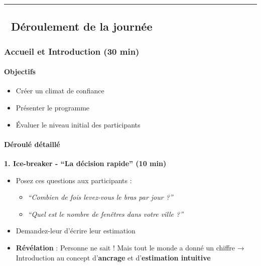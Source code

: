 \documentclass[
]{article}
\providecommand{\tightlist}{%
  \setlength{\itemsep}{0pt}\setlength{\parskip}{0pt}}
\begin{document}
\begin{center}\rule{0.5\linewidth}{0.5pt}\end{center}

\subsection{📅 Déroulement de la
journée}\label{duxe9roulement-de-la-journuxe9e}

\subsubsection{\texorpdfstring{\textbf{Accueil et Introduction (30
min)}}{Accueil et Introduction (30 min)}}\label{accueil-et-introduction-30-min}

\paragraph{Objectifs}\label{objectifs}

\begin{itemize}
\tightlist
\item
  Créer un climat de confiance
\item
  Présenter le programme
\item
  Évaluer le niveau initial des participants
\end{itemize}

\paragraph{Déroulé détaillé}\label{duxe9rouluxe9-duxe9tailluxe9}

\textbf{1. Ice-breaker - ``La décision rapide'' (10 min)}

\begin{itemize}
\tightlist
\item
  Posez ces questions aux participants :

  \begin{itemize}
  \tightlist
  \item
    \emph{``Combien de fois levez-vous le bras par jour ?''}
  \item
    \emph{``Quel est le nombre de fenêtres dans votre ville ?''}
  \end{itemize}
\item
  Demandez-leur d'écrire leur estimation
\item
  \textbf{Révélation} : Personne ne sait ! Mais tout le monde a donné un
  chiffre → Introduction au concept d'\textbf{ancrage} et
  d'\textbf{estimation intuitive}
\end{itemize}
\end{document}

